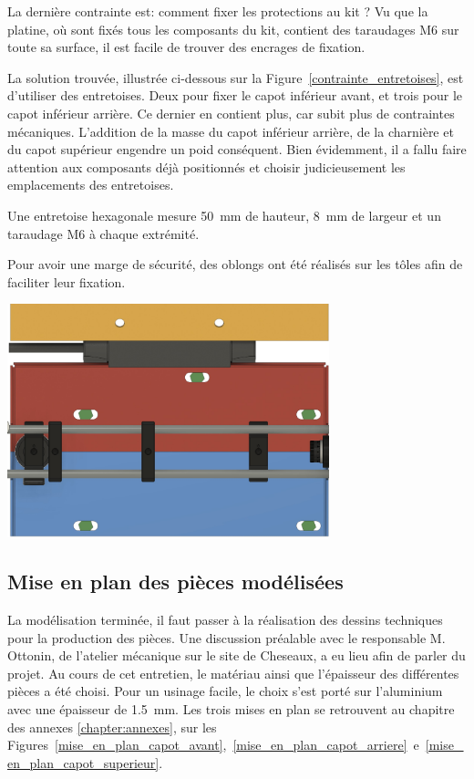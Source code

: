 \begin{minipage}{\textwidth}
    La dernière contrainte est: comment fixer les protections au kit ? Vu que la platine, où sont fixés tous les composants du kit, contient des taraudages M6 sur toute sa surface, il est facile de trouver des encrages de fixation.

    La solution trouvée, illustrée ci-dessous sur la Figure~\ref{contrainte_entretoises}, est d'utiliser des entretoises. Deux pour fixer le capot inférieur avant, et trois pour le capot inférieur arrière. Ce dernier en contient plus, car subit plus de contraintes mécaniques. L'addition de la masse du capot inférieur arrière, de la charnière et du capot supérieur engendre un poid conséquent. Bien évidemment, il a fallu faire attention aux composants déjà positionnés et choisir judicieusement les emplacements des entretoises.

    Une entretoise hexagonale mesure 50~mm de hauteur, 8~mm de largeur et un taraudage M6 à chaque extrémité.

    Pour avoir une marge de sécurité, des oblongs ont été réalisés sur les tôles afin de faciliter leur fixation.
    \vspace{1em}
    \begin{center}
        \includegraphics[width=0.7\textwidth]{assets/figures/Protections_laser/Securite_mecanique/Protection_entree_laser/contrainte_entretoises.jpeg}
    \end{center}
    \label{contrainte_entretoises}
\end{minipage}

\subsection{Mise en plan des pièces modélisées}
La modélisation terminée, il faut passer à la réalisation des dessins techniques pour la production des pièces. Une discussion préalable avec le responsable M. Ottonin, de l'atelier mécanique sur le site de Cheseaux, a eu lieu afin de parler du projet. Au cours de cet entretien, le matériau ainsi que l'épaisseur des différentes pièces a été choisi. Pour un usinage facile, le choix s'est porté sur l'aluminium avec une épaisseur de 1.5~mm. Les trois mises en plan se retrouvent au chapitre des annexes \ref{chapter:annexes}, sur les Figures~\ref{mise_en_plan_capot_avant},~\ref{mise_en_plan_capot_arriere}~e~\ref{mise_en_plan_capot_superieur}.

